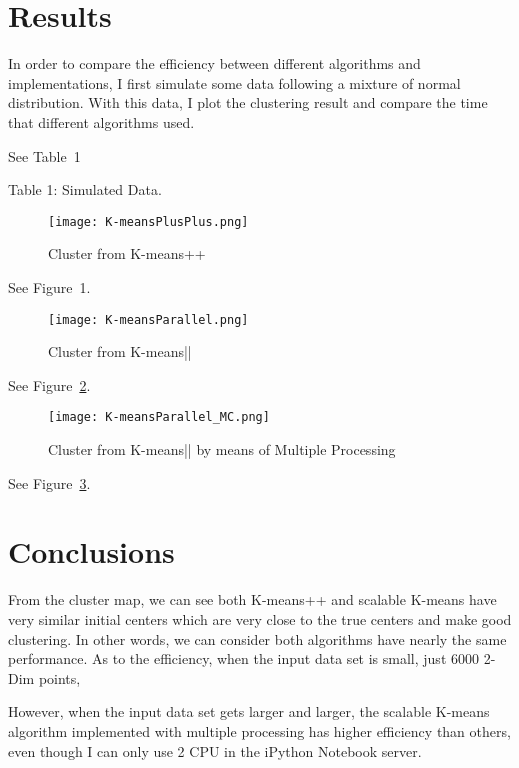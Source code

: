 \documentclass{article}
\begin{document}
\section{Results}

In order to compare the efficiency between different algorithms and implementations, I first simulate some data following a mixture of normal distribution. With this data, I plot the clustering result and compare the time that different algorithms used.

See Table~1

\begin{minipage}{\textwidth}
  \centering{ }
  \medskip

  Table 1: Simulated Data.

  \medskip

  \label{tbl:hits}
\end{minipage}


\begin{figure}
\texttt{[image: K-meansPlusPlus.png]}
\caption {Cluster from K-means++}
\label{fig:K-MeansPlusPlus}
\end{figure}
See Figure~1.


\begin{figure}
\texttt{[image: K-meansParallel.png]}
\caption {Cluster from K-means||}
\label{fig:K-MeansParallel}
\end{figure}
See Figure~\ref{fig:K-MeansParallel}.


\begin{figure}
\texttt{[image: K-meansParallel\_MC.png]}
\caption {Cluster from K-means|| by means of Multiple Processing}
\label{fig:K-MeansParallel_MC}
\end{figure}
See Figure~\ref{fig:K-MeansParallel_MC}.


\section{Conclusions}

From the cluster map, we can see both K-means++ and scalable K-means have very similar initial centers which are very close to the true centers and make good clustering. In other words, we can consider both algorithms have nearly the same performance. As to the efficiency, when the input data set is small, just 6000 2-Dim points, 

However, when the input data set gets larger and larger, the scalable K-means algorithm implemented with multiple processing has higher efficiency than others, even though I can only use 2 CPU in the iPython Notebook server.
\end{document}
